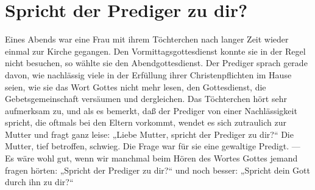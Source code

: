 \chapter{Spricht der Prediger zu dir?}

Eines Abends war eine Frau mit ihrem Töchterchen nach langer Zeit wieder einmal zur Kirche gegangen. Den Vormittagsgottesdienst konnte sie in der Regel nicht besuchen, so wählte sie den Abendgottesdienst. Der Prediger sprach gerade davon, wie nachlässig viele in der Erfüllung ihrer Christenpflichten im Hause seien, wie sie das Wort Gottes nicht mehr lesen, den Gottesdienst, die Gebetsgemeinschaft versäumen und dergleichen. Das Töchterchen hört sehr aufmerksam zu, und als es bemerkt, daß der Prediger von einer Nachlässigkeit spricht, die oftmals bei den Eltern vorkommt, wendet es sich zutraulich zur Mutter und fragt ganz leise: „Liebe Mutter, spricht der Prediger zu dir?“ Die Mutter, tief betroffen, schwieg. Die Frage war für sie eine gewaltige Predigt. — Es wäre wohl gut, wenn wir manchmal beim Hören des Wortes Gottes jemand fragen hörten: „Spricht der Prediger zu dir?“ und noch besser: „Spricht dein Gott durch ihn zu dir?“
